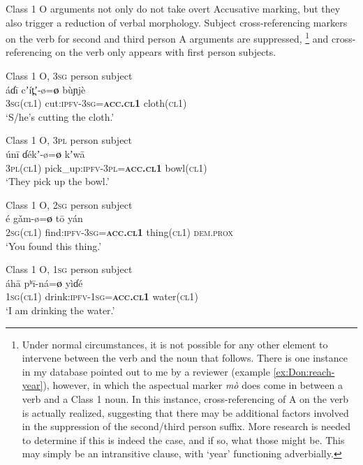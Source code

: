 \documentclass[output=collectionpaper,hidelinks]{langscibook}
\theoremstyle{remark}
\begin{document}
Class 1 O arguments not only do not take overt Accusative marking, but they also
trigger a reduction of verbal morphology.  Subject cross-referencing markers on
the verb for second and third person A arguments are suppressed,%
\footnote{Under normal circumstances, it is not possible for any other element
to intervene between the verb and the noun that follows.  There is one
instance in my database pointed out to me by a reviewer (example
\ref{ex:Don:reach-year}), however, in which the aspectual marker \emph{mò} does
come in between a verb and a Class 1 noun.  In this instance, cross-referencing
of A on the verb is actually realized, suggesting that there may be additional
factors involved in the suppression of the second/third person suffix.  More
research is needed to determine if this is indeed the case, and if so, what
those might be.  This may simply be an intransitive clause, with `year'
functioning adverbially.} %
and cross-referencing on the verb only appears with first person subjects.


\ea
\label{ex:Don:cut-cloth}
Class 1 O, \textsc{3sg} person subject \\
\gll áɗī cʼít̪ʼ-ø=\textbf{ø} bùɲjè \\
 \textsc{3sg}(\textsc{cl1}) cut:\textsc{ipfv}-\textsc{3sg}=\textbf{\textsc{acc.cl1}} cloth(\textsc{cl1}) \\
\glt `S/he's cutting the cloth.' \\
\z

\ea
\label{ex:Don:pick-bowl}
Class 1 O, \textsc{3pl} person subject \\
\gll únī ɗékʼ-ø=\textbf{ø} kʼwā \\
 \textsc{3pl}(\textsc{cl1}) pick\_up:\textsc{ipfv}-\textsc{3pl}=\textbf{\textsc{acc.cl1}} bowl(\textsc{cl1}) \\
\glt `They pick up the bowl.' \\
\z

\ea
\label{ex:Don:found-thing}
Class 1 O, \textsc{2sg} person subject \\
\gll é gǎm-ø=\textbf{ø} tō yán \\
 \textsc{2sg}(\textsc{cl1}) find:\textsc{ipfv}-\textsc{3sg}=\textbf{\textsc{acc.cl1}} thing(\textsc{cl1}) \textsc{dem.prox} \\
\glt `You found this thing.' \\
\z

\ea\label{ex:Don:drink-water}
 Class 1 O, \textsc{1sg} person subject \\
\gll áhā pʰī-ná=\textbf{ø} yìɗé \\
 \textsc{1sg}(\textsc{cl1}) drink:\textsc{ipfv}-\textsc{1sg}=\textbf{\textsc{acc.cl1}} water(\textsc{cl1}) \\
\glt `I am drinking the water.' \\
\z
\end{document}
